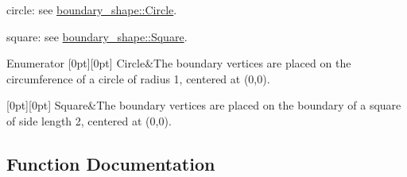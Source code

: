 \begin{DoxyItemize}
\item circle\+: see \hyperlink{namespacegeoproc_1_1parametrisation_a7f001bf497830114e8aea2c884a948b7a30954d90085f6eaaf5817917fc5fecb3}{boundary\+\_\+shape\+::\+Circle}.
\item square\+: see \hyperlink{namespacegeoproc_1_1parametrisation_a7f001bf497830114e8aea2c884a948b7aceb46ca115d05c51aa5a16a8867c3304}{boundary\+\_\+shape\+::\+Square}. 
\end{DoxyItemize}\begin{DoxyEnumFields}{Enumerator}
[0pt][0pt]{}\mbox{\label{namespacegeoproc_1_1parametrisation_a7f001bf497830114e8aea2c884a948b7a30954d90085f6eaaf5817917fc5fecb3}} 
Circle&The boundary vertices are placed on the circumference of a circle of radius 1, centered at (0,0). \\
\hline

[0pt][0pt]{}\mbox{\label{namespacegeoproc_1_1parametrisation_a7f001bf497830114e8aea2c884a948b7aceb46ca115d05c51aa5a16a8867c3304}} 
Square&The boundary vertices are placed on the boundary of a square of side length 2, centered at (0,0). \\
\hline

\end{DoxyEnumFields}


\subsection{Function Documentation}
\mbox{\label{namespacegeoproc_1_1parametrisation_aa73e02d994e3ef3eba0fcfc5863c8416}} 
